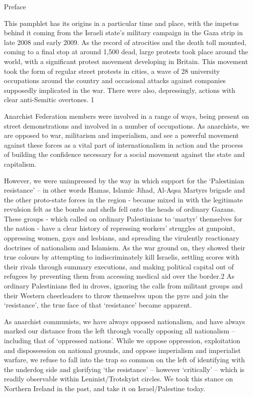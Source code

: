 Preface

This pamphlet has its origins in a particular time and place, with the impetus behind it coming from the Israeli state’s military campaign in the Gaza strip in late 2008 and early 2009.
As the record of atrocities and the death toll mounted, coming to a final stop at around 1,500 dead, large protests took place around the world, with a significant protest movement developing in Britain.
This movement took the form of regular street protests in cities, a wave of 28 university occupations around the country and occasional attacks against companies supposedly implicated in the war.
There were also, depressingly, actions with clear anti-Semitic overtones.
1

Anarchist Federation members were involved in a range of ways, being present on street demonstrations and involved in a number of occupations.
As anarchists, we are opposed to war, militarism and imperialism, and see a powerful movement against these forces as a vital part of internationalism in action and the process of building the confidence necessary for a social movement against the state and capitalism.

However, we were unimpressed by the way in which support for the ‘Palestinian resistance’ – in other words Hamas, Islamic Jihad, Al-Aqsa Martyrs brigade and the other proto-state forces in the region - became mixed in with the legitimate revulsion felt as the bombs and shells fell onto the heads of ordinary Gazans.
These groups - which called on ordinary Palestinians to ‘martyr’ themselves for the nation - have a clear history of repressing workers’ struggles at gunpoint, oppressing women, gays and lesbians, and spreading the virulently reactionary doctrines of nationalism and Islamism.
As the war ground on, they showed their true colours by attempting to indiscriminately kill Israelis, settling scores with their rivals through summary executions, and making political capital out of refugees by preventing them from accessing medical aid over the border.2 As ordinary Palestinians fled in droves, ignoring the calls from militant groups and their Western cheerleaders to throw themselves upon the pyre and join the ‘resistance’, the true face of that ‘resistance’ became apparent.

As anarchist communists, we have always opposed nationalism, and have always marked our distance from the left through vocally opposing all nationalism – including that of ‘oppressed nations’.
While we oppose oppression, exploitation and dispossession on national grounds, and oppose imperialism and imperialist warfare, we refuse to fall into the trap so common on the left of identifying with the underdog side and glorifying ‘the resistance’ – however ‘critically’ – which is readily observable within Leninist/Trotskyist circles.
We took this stance on Northern Ireland in the past, and take it on Israel/Palestine today.

